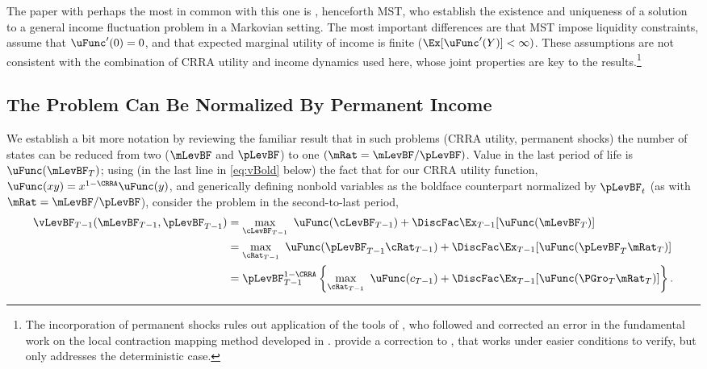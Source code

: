 \documentclass[BufferStockTheory]{subfiles}
\begin{document}
The paper with perhaps the most in common with this one is \cite{mstIncFluct}, henceforth MST, who establish the existence and uniqueness of a solution to a general income fluctuation problem in a Markovian setting.  The most important differences are that MST impose liquidity constraints, assume that $\uFunc^{\prime}(0)=0$, and that expected marginal utility of income is finite ($\Ex[\uFunc^{\prime}(Y)]<\infty)$.  These assumptions are not consistent with the combination of CRRA utility and income dynamics used here, whose joint properties are key to the results.\footnote{The incorporation of permanent shocks rules out application of the tools of \cite{mnUnique}, who followed and corrected an error in the fundamental work on the local contraction mapping method developed in \cite{rrExistence}.  \cite{mvExistence} provide a correction to \cite{rrExistence}, that works under easier conditions to verify, but only addresses the deterministic case.}

\hypertarget{The-Problem-Can-Be-Rewritten-in-Ratio-Form}{}
\hypertarget{The-Problem-Can-Be-Normalized-By-Permanent-Income}{}
\subsection{The Problem Can Be Normalized By Permanent Income}

\label{subsec:ratio}

We establish a bit more notation by reviewing the familiar result that in such problems (CRRA utility, permanent shocks) the number of states can be reduced from two ($\mLevBF$ and $\pLevBF$) to one $(\mRat = \mLevBF/\pLevBF)$.  Value in the last period of life is $\uFunc(\mLevBF_{T})$; using (in the last line in \eqref{eq:vBold} below) the fact that for our CRRA utility function, $\uFunc(xy) = x^{1-\CRRA}\uFunc(y)$, and generically defining nonbold variables as the boldface counterpart normalized by $\pLevBF_{t}$ (as with $\mRat=\mLevBF/\pLevBF$), consider the problem in the second-to-last period,
\begin{align}
  \vLevBF_{T-1}(\mLevBF_{T-1},\pLevBF_{T-1})  & = 
                                                \max_{\cLevBF_{T-1}}~ \uFunc(\cLevBF_{T-1}) +\DiscFac \Ex_{T-1} [ \uFunc(\mLevBF_{T})]
                                                \notag \\
                                              & =  \max_{\cRat_{T-1}}~
                                                \uFunc(\pLevBF_{T-1}\cRat_{T-1}) + \DiscFac  \Ex_{T-1} [\uFunc(\pLevBF_{T}{\mRat}
                                                _{T})]  \notag \\
                                              & = \pLevBF_{T-1}^{1-\CRRA}
                                                \left\{\max_{\cRat_{T-1}}~ \uFunc(c_{T-1}) + \DiscFac \Ex_{T-1} [ \uFunc( {\PGro}_{T}
                                                {\mRat}_{T}) ] \right\}.   \label{eq:vBold}
\end{align}
\end{document}
